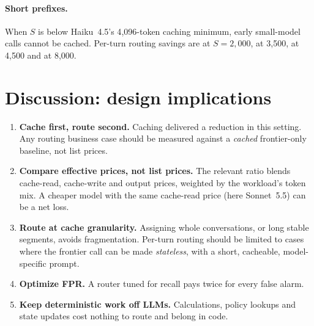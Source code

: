 \documentclass[10pt]{article}
\begin{document}
\paragraph{Short prefixes.} When $S$ is below Haiku~4.5's 4{,}096-token caching minimum, early small-model calls cannot be cached. Per-turn routing savings are \spA{} at $S{=}2{,}000$, \spB{} at 3{,}500, \spC{} at 4{,}500 and \spD{} at 8{,}000.

\section{Discussion: design implications}\label{sec:discussion}
\begin{enumerate}[leftmargin=*,itemsep=2pt]
\item \textbf{Cache first, route second.} Caching delivered a \cachedisc{} reduction in this setting. Any routing business case should be measured against a \emph{cached} frontier-only baseline, not list prices.
\item \textbf{Compare effective prices, not list prices.} The relevant ratio blends cache-read, cache-write and output prices, weighted by the workload's token mix. A cheaper model with the same cache-read price (here Sonnet~5.5) can be a net loss.
\item \textbf{Route at cache granularity.} Assigning whole conversations, or long stable segments, avoids fragmentation. Per-turn routing should be limited to cases where the frontier call can be made \emph{stateless}, with a short, cacheable, model-specific prompt.
\item \textbf{Optimize FPR.} A router tuned for recall pays twice for every false alarm.
\item \textbf{Keep deterministic work off LLMs.} Calculations, policy lookups and state updates cost nothing to route and belong in code.
\end{enumerate}
\end{document}
